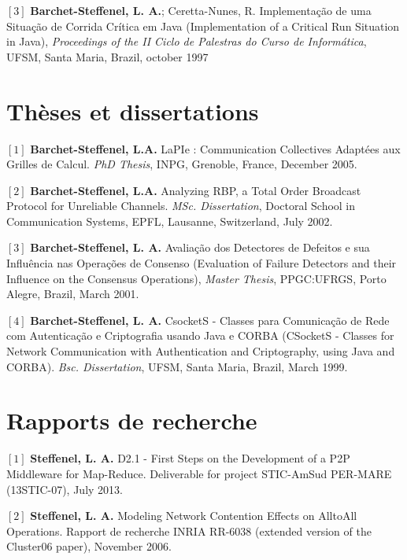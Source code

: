\documentclass[final,twoside]{hdr} %
\begin{document}
\vspace{1em} \noindent $[3]$
\textbf{Barchet-Steffenel, L. A.}; Ceretta-Nunes, R. {Implementação de uma Situação de Corrida Crítica em Java} (Implementation of a Critical Run Situation in Java), {\em Proceedings of the II Ciclo de Palestras do Curso de Informática}, UFSM, Santa Maria, Brazil, october 1997

\section*{Thèses et dissertations}

\noindent $[1]$
\textbf{Barchet-Steffenel, L.A.} {LaPIe : Communication Collectives Adaptées aux Grilles de Calcul}. {\em PhD Thesis}, INPG, Grenoble, France, December 2005. 

\vspace{1em} \noindent $[2]$
\textbf{Barchet-Steffenel, L.A.} {Analyzing RBP, a Total Order Broadcast Protocol for Unreliable Channels}. {\em MSc. Dissertation}, Doctoral School in Communication Systems, EPFL, Lausanne, Switzerland, July 2002.

\vspace{1em} \noindent $[3]$
\textbf{Barchet-Steffenel, L. A.} {Avaliação dos Detectores de Defeitos e sua Influência nas Operações de Consenso} (Evaluation of Failure Detectors and their Influence on the Consensus Operations), {\em Master Thesis}, PPGC:UFRGS, Porto Alegre, Brazil, March 2001.

\vspace{1em} \noindent $[4]$
\textbf{Barchet-Steffenel, L. A.} {CsocketS - Classes para Comunicação de Rede com Autenticação e Criptografia usando Java e CORBA} (CSocketS - Classes for Network Communication with Authentication and Criptography, using Java and CORBA). {\em Bsc. Dissertation}, UFSM, Santa Maria, Brazil, March 1999.


\section*{Rapports de recherche}

 \noindent $[1]$
\textbf{Steffenel, L. A.} {D2.1 - First Steps on the Development of a P2P Middleware for Map-Reduce}. Deliverable for project STIC-AmSud PER-MARE (13STIC-07), July 2013. 

\vspace{1em} \noindent $[2]$
\textbf{Steffenel, L. A.} {Modeling Network Contention Effects on AlltoAll Operations}. Rapport de recherche INRIA RR-6038 (extended version of the Cluster06 paper), November 2006. 
\end{document}

